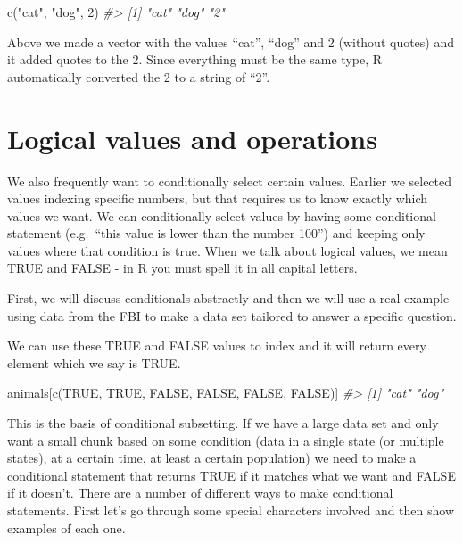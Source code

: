 \documentclass[
  12pt,
  openany]{book}
\newenvironment{Shaded}{\begin{snugshade}}{\end{snugshade}}
\newcommand{\CommentTok}[1]{\textcolor[rgb]{0.37,0.37,0.37}{\textit{#1}}}
\newcommand{\ConstantTok}[1]{\textcolor[rgb]{0,0,0}{#1}}
\newcommand{\DecValTok}[1]{\textcolor[rgb]{0.06,0.06,0.06}{#1}}
\newcommand{\FunctionTok}[1]{\textcolor[rgb]{0,0,0}{#1}}
\newcommand{\NormalTok}[1]{#1}
\newcommand{\StringTok}[1]{\textcolor[rgb]{0.5,0.5,0.5}{#1}}
\begin{document}
\begin{Shaded}
\begin{Highlighting}[]
\FunctionTok{c}\NormalTok{(}\StringTok{"cat"}\NormalTok{, }\StringTok{"dog"}\NormalTok{, }\DecValTok{2}\NormalTok{)}
\CommentTok{\#\textgreater{} [1] "cat" "dog" "2"}
\end{Highlighting}
\end{Shaded}

Above we made a vector with the values ``cat'', ``dog'' and 2 (without quotes) and it added quotes to the 2. Since everything must be the same type, R automatically converted the 2 to a string of ``2''.

\hypertarget{logical-values-and-operations}{%
\section{Logical values and operations}\label{logical-values-and-operations}}

We also frequently want to conditionally select certain values. Earlier we selected values indexing specific numbers, but that requires us to know exactly which values we want. We can conditionally select values by having some conditional statement (e.g.~``this value is lower than the number 100'') and keeping only values where that condition is true. When we talk about logical values, we mean TRUE and FALSE - in R you must spell it in all capital letters.

First, we will discuss conditionals abstractly and then we will use a real example using data from the FBI to make a data set tailored to answer a specific question.

We can use these TRUE and FALSE values to index and it will return every element which we say is TRUE.

\begin{Shaded}
\begin{Highlighting}[]
\NormalTok{animals[}\FunctionTok{c}\NormalTok{(}\ConstantTok{TRUE}\NormalTok{, }\ConstantTok{TRUE}\NormalTok{, }\ConstantTok{FALSE}\NormalTok{, }\ConstantTok{FALSE}\NormalTok{, }\ConstantTok{FALSE}\NormalTok{, }\ConstantTok{FALSE}\NormalTok{)]}
\CommentTok{\#\textgreater{} [1] "cat" "dog"}
\end{Highlighting}
\end{Shaded}

This is the basis of conditional subsetting. If we have a large data set and only want a small chunk based on some condition (data in a single state (or multiple states), at a certain time, at least a certain population) we need to make a conditional statement that returns TRUE if it matches what we want and FALSE if it doesn't. There are a number of different ways to make conditional statements. First let's go through some special characters involved and then show examples of each one.
\end{document}
